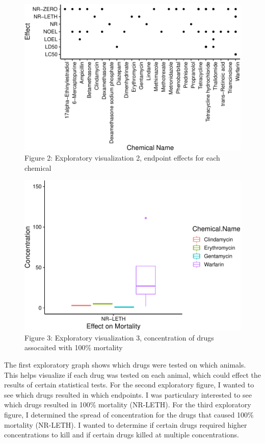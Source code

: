 \documentclass[12pt,]{article}
\begin{document}
\begin{figure}
\centering
\includegraphics{Reents_ENV872L_Project_files/figure-latex/Exploratory 2-1.pdf}
\caption{Figure 2: Exploratory visualization 2, endpoint effects for
each chemical}
\end{figure}

\begin{figure}
\centering
\includegraphics{Reents_ENV872L_Project_files/figure-latex/exploratory 3-1.pdf}
\caption{Figure 3: Exploratory visualization 3, concentration of drugs
assocaited with 100\% mortality}
\end{figure}

The first exploratory graph shows which drugs were tested on which
animals. This helps visualize if each drug was tested on each animal,
which could effect the results of certain statistical tests. For the
second exploratory figure, I wanted to see which drugs resulted in which
endpoints. I was particulary interested to see which drugs resulted in
100\% mortality (NR-LETH). For the third exploratory figure, I
determined the spread of concentration for the drugs that caused 100\%
mortality (NR-LETH). I wanted to determine if certain drugs required
higher concentrations to kill and if certain drugs killed at multiple
concentrations.
\end{document}
